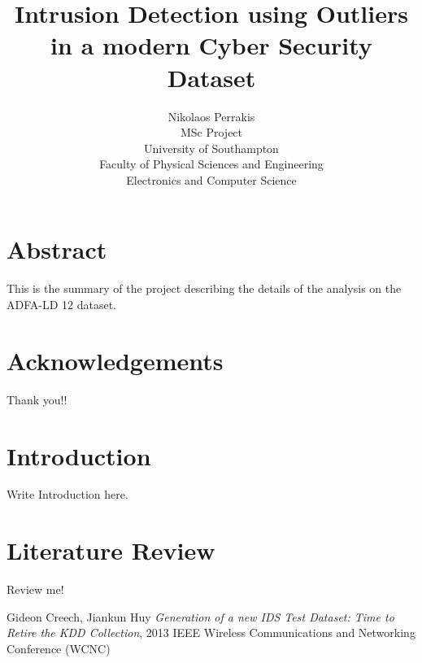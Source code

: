\documentclass[reqno,openany,12pt]{amsbook}
\title{Intrusion Detection using Outliers in a modern Cyber Security Dataset}
\author{Nikolaos Perrakis\\
{\small
MSc Project\\[-1 ex]
University of Southampton\\[-1 ex]
Faculty of Physical Sciences and Engineering\\[-1 ex]
Electronics and Computer Science\\[-1 ex]
}
}
\theoremstyle{definition}
\theoremstyle{remark}
\begin{document}
\maketitle

\frontmatter


\chapter*{Abstract}
\setcounter{page}{1}
This is the summary of the project describing the details of the analysis on the ADFA-LD 12 dataset.



\chapter*{Acknowledgements}

Thank you!!


\tableofcontents
\listoffigures


\mainmatter

\chapter{Introduction}

Write Introduction here.

\chapter{Literature Review}

Review me!



\begin{thebibliography}{99}


 Gideon Creech, Jiankun Huy \emph{Generation of a new IDS Test Dataset: Time to Retire the KDD Collection}, 
2013 IEEE Wireless Communications and Networking Conference (WCNC)


%



\end{thebibliography}
\end{document}

